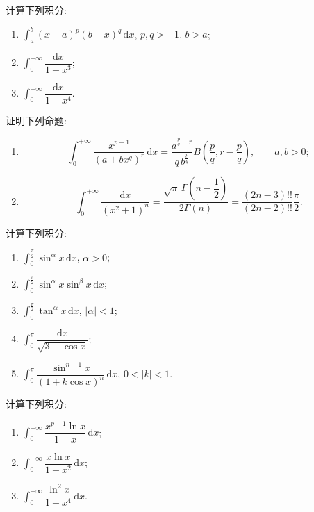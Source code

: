 \documentclass[../数学分析培优讲义.tex]{subfiles}
\begin{document}
\begin{example}
计算下列积分:
\begin{enumerate}[label=(\arabic*)]
    \item $\displaystyle\int_a^b(x-a)^p(b-x)^q\,\mathrm{d}x$, $p,q>-1$, $b>a$;
    \item $\displaystyle\int_0^{+\infty}\dfrac{\mathrm{d}x}{1+x^3}$;
    \item $\displaystyle\int_0^{+\infty}\dfrac{\mathrm{d}x}{1+x^4}$.
\end{enumerate}
\end{example}
\exampleblank

\begin{example}
证明下列命题:
\begin{enumerate}[label=(\arabic*)]
    \item
    \[
        \int_0^{+\infty}\dfrac{x^{p-1}}{(a+bx^q)^r}\,\mathrm{d}x
        =\dfrac{a^{\frac{p}{q}-r}}{q\,b^{\frac{p}{q}}}
        B\left(\dfrac{p}{q},r-\dfrac{p}{q}\right),\qquad a,b>0;
    \]
    \item
    \[
        \int_0^{+\infty}\dfrac{\mathrm{d}x}{(x^2+1)^n}
        =\dfrac{\sqrt{\pi}\,\Gamma\left(n-\dfrac{1}{2}\right)}{2\Gamma(n)}
        =\dfrac{(2n-3)!!}{(2n-2)!!}\dfrac{\pi}{2}.
    \]
\end{enumerate}
\end{example}
\exampleblank

\begin{example}
计算下列积分:
\begin{enumerate}[label=(\arabic*)]
    \item $\displaystyle\int_0^{\frac{\pi}{2}}\sin^\alpha x\,\mathrm{d}x$, $\alpha>0$;
    \item $\displaystyle\int_0^{\frac{\pi}{2}}\sin^\alpha x\sin^\beta x\,\mathrm{d}x$;
    \item $\displaystyle\int_0^{\frac{\pi}{2}}\tan^\alpha x\,\mathrm{d}x$, $|\alpha|<1$;
    \item $\displaystyle\int_0^\pi\dfrac{\mathrm{d}x}{\sqrt{3-\cos x}}$;
    \item $\displaystyle\int_0^\pi\dfrac{\sin^{n-1}x}{(1+k\cos x)^n}\,\mathrm{d}x$, $0<|k|<1$.
\end{enumerate}
\end{example}
\exampleblank

\begin{example}
计算下列积分:
\begin{enumerate}[label=(\arabic*)]
    \item $\displaystyle\int_0^{+\infty}\dfrac{x^{p-1}\ln x}{1+x}\,\mathrm{d}x$;
    \item $\displaystyle\int_0^{+\infty}\dfrac{x\ln x}{1+x^2}\,\mathrm{d}x$;
    \item $\displaystyle\int_0^{+\infty}\dfrac{\ln^2x}{1+x^4}\,\mathrm{d}x$.
\end{enumerate}
\end{example}
\exampleblank
\end{document}
